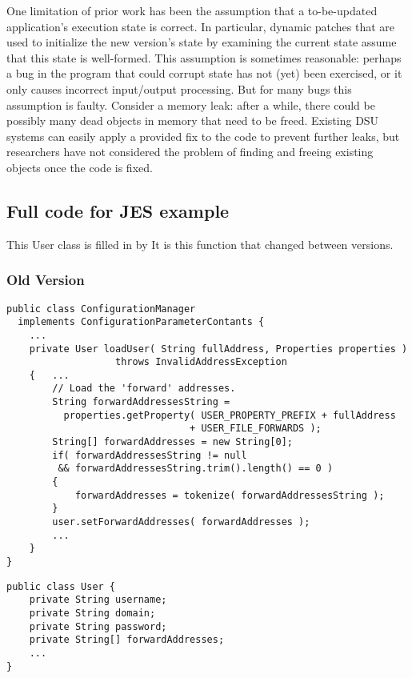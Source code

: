 One limitation of prior work has been the assumption that a
to-be-updated application's execution state is correct.  In
particular, dynamic patches that are used to initialize the new
version's state by examining the current state assume that this state
is well-formed.  This assumption is sometimes reasonable: perhaps a
bug in the program that could corrupt state has not (yet) been
exercised, or it only causes incorrect input/output processing.  But
for many bugs this assumption is faulty.  Consider a memory leak:
after a while, there could be possibly many dead objects in memory
that need to be freed.  Existing DSU systems can easily apply a
provided fix to the code to prevent further leaks, but researchers
have not considered the problem of finding and freeing existing
objects once the code is fixed.

\subsection{Full code for JES example}

This User class is filled in by 
It is this function that changed between versions.

\subsubsection{Old Version}
\begin{lstlisting}
public class ConfigurationManager
  implements ConfigurationParameterContants {
    ...
    private User loadUser( String fullAddress, Properties properties )
                   throws InvalidAddressException
    {   ...
        // Load the 'forward' addresses.
        String forwardAddressesString =
          properties.getProperty( USER_PROPERTY_PREFIX + fullAddress 
                                + USER_FILE_FORWARDS );
        String[] forwardAddresses = new String[0];
        if( forwardAddressesString != null 
         && forwardAddressesString.trim().length() == 0 )
        {
            forwardAddresses = tokenize( forwardAddressesString );
        }
        user.setForwardAddresses( forwardAddresses );
        ...
    }
}
\end{lstlisting}

\begin{lstlisting}
public class User {
    private String username;
    private String domain;
    private String password;
    private String[] forwardAddresses;
    ...
}
\end{lstlisting}

